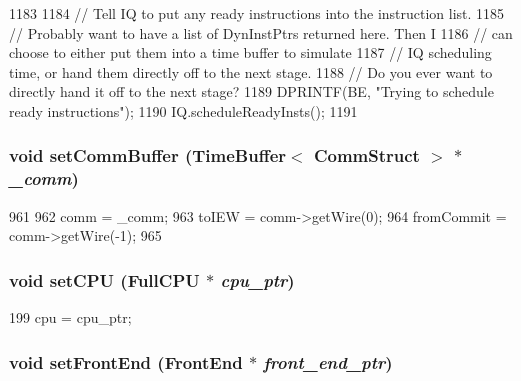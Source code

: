 \begin{DoxyCode}
1183 {
1184     // Tell IQ to put any ready instructions into the instruction list.
1185     // Probably want to have a list of DynInstPtrs returned here.  Then I
1186     // can choose to either put them into a time buffer to simulate
1187     // IQ scheduling time, or hand them directly off to the next stage.
1188     // Do you ever want to directly hand it off to the next stage?
1189     DPRINTF(BE, "Trying to schedule ready instructions\n");
1190     IQ.scheduleReadyInsts();
1191 }
\end{DoxyCode}
\hypertarget{classBackEnd_aeabdb9f0aae07df67c3029f8fddb2693}{
\subsubsection[{setCommBuffer}]{\setlength{\rightskip}{0pt plus 5cm}void setCommBuffer ({\bf TimeBuffer}$<$ {\bf CommStruct} $>$ $\ast$ {\em \_\-comm})}}
\label{classBackEnd_aeabdb9f0aae07df67c3029f8fddb2693}



\begin{DoxyCode}
961 {
962     comm = _comm;
963     toIEW = comm->getWire(0);
964     fromCommit = comm->getWire(-1);
965 }
\end{DoxyCode}
\hypertarget{classBackEnd_ad491c9766121fc19aa77fd0723e7641d}{
\subsubsection[{setCPU}]{\setlength{\rightskip}{0pt plus 5cm}void setCPU ({\bf FullCPU} $\ast$ {\em cpu\_\-ptr})}}
\label{classBackEnd_ad491c9766121fc19aa77fd0723e7641d}



\begin{DoxyCode}
199     { cpu = cpu_ptr; }
\end{DoxyCode}
\hypertarget{classBackEnd_a122009fa2730cee3898ac945227da8eb}{
\subsubsection[{setFrontEnd}]{\setlength{\rightskip}{0pt plus 5cm}void setFrontEnd ({\bf FrontEnd} $\ast$ {\em front\_\-end\_\-ptr})}}
\label{classBackEnd_a122009fa2730cee3898ac945227da8eb}



